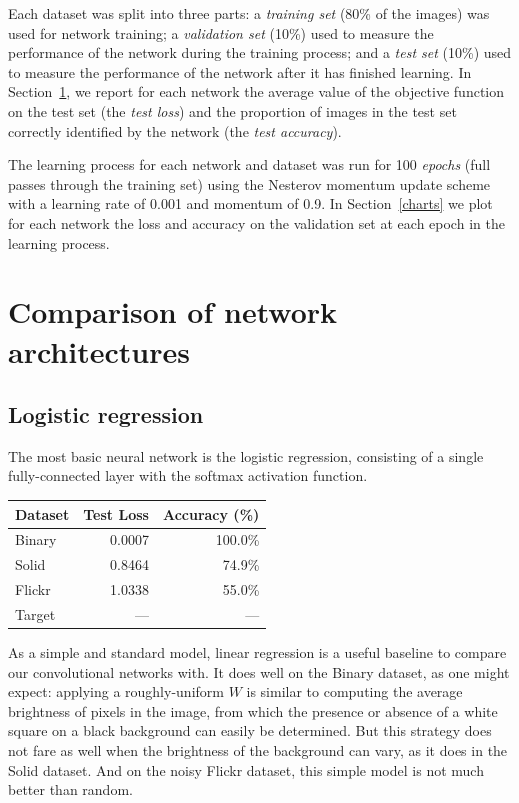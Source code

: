 \documentclass{article}
\newcommand{\dataset}[1]{\textsf{#1}}
\begin{document}
  Each dataset was split into three parts: a \emph{training set} (80\% of the images) was used for network training; a \emph{validation set} (10\%) used to measure the performance of the network during the training process; and a \emph{test set} (10\%) used to measure the performance of the network after it has finished learning. In Section~\ref{results}, we report for each network the average value of the objective function on the test set (the \emph{test loss}) and the proportion of images in the test set correctly identified by the network (the \emph{test accuracy}).

  The learning process for each network and dataset was run for 100 \emph{epochs} (full passes through the training set) using the Nesterov momentum update scheme with a learning rate of 0.001 and momentum of 0.9. In Section~\ref{charts} we plot for each network the loss and accuracy on the validation set at each epoch in the learning process.


\section{Comparison of network architectures}\label{results}
  \subsection{Logistic regression}

    The most basic neural network is the logistic regression, consisting of a single fully-connected layer with the softmax activation function.

    \begin{table}[ht]
      \centering
      \begin{tabular}{lrr}\toprule
        \textbf{Dataset} & \textbf{Test Loss} & \textbf{Accuracy (\%)}\\\midrule
        \dataset{Binary} & 0.0007 & 100.0\% \\
        \dataset{Solid}  & 0.8464 &  74.9\% \\ %
        \dataset{Flickr} & 1.0338 &  55.0\% \\ %
        \dataset{Target} &    --- &     --- \\ \bottomrule
      \end{tabular}
    \end{table}

    As a simple and standard model, linear regression is a useful baseline to compare our convolutional networks with. It does well on the \dataset{\dataset{Binary}} dataset, as one might expect: applying a roughly-uniform $W$ is similar to computing the average brightness of pixels in the image, from which the presence or absence of a white square on a black background can easily be determined. But this strategy does not fare as well when the brightness of the background can vary, as it does in the \dataset{Solid} dataset. And on the noisy \dataset{Flickr} dataset, this simple model is not much better than random.
\end{document}
